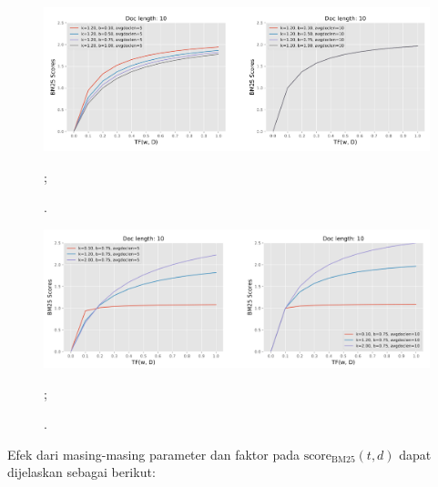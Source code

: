     \begin{figure}
        \centering
        \includegraphics[width=1\textwidth]{assets/pics/effect-bm25-param-b.png}
        \caption{\license.};
        \label{fig:effect-bm25-param-b}
    \end{figure}

    \begin{figure}
        \centering
        \includegraphics[width=1\textwidth]{assets/pics/effect-bm25-param-k.png}
        \caption{\license.};
        \label{fig:effect-bm25-param-k}
    \end{figure}

    Efek dari masing-masing parameter dan faktor pada $\text{score}_{\text{BM25}}(t,d)$ dapat dijelaskan sebagai berikut:

